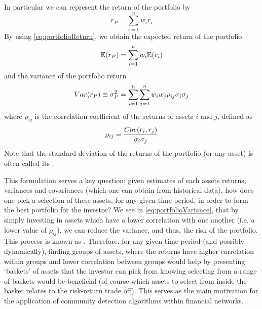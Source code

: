 In particular we can represent the return of the portfolio by
\begin{equation}
	\label{eq:portfolioReturn}
	r_{P} = \sum_{i=1}^{n} w_{i} r_{i}
\end{equation}
By using \cref{eq:portfolioReturn}, we obtain the expected return of the portfolio
\begin{equation}
	\label{eq:portfolioExpectedReturn}
	\mathbb{E}(r_{P}) = \sum_{i=1}^{n} w_{i} \mathbb{E}(r_{i})
\end{equation}
and the variance of the portfolio return
\begin{equation}
	\label{eq:portfolioVariance}
	Var(r_{P}) \equiv \sigma^{2}_{P}  = \sum_{i=1}^{n} \sum_{j=1}^{n} w_{i} w_{j} \rho_{ij} \sigma_{i} \sigma_{j}
\end{equation}
where $\rho_{ij}$ is the correlation coefficient of the returns of assets $i$ and $j$, defined as
\begin{equation}
	\label{eq:correlationCoefficient}
	\rho_{ij} = \frac{\covariance{r_{i},r_{j}}}{\sigma_{i} \sigma_{j}}
\end{equation}
Note that the standard deviation of the returns of the portfolio (or any asset) is often called its .

This formulation serves a key question; given estimates of each assets returns, variances and covariances (which one can obtain from historical data), how does one pick a selection of these assets, for any given time period, in order to form the best portfolio for the investor?
We see in \cref{eq:portfolioVariance}, that by simply investing in assets which have a lower correlation with one another (i.e. a lower value of $\rho_{ij}$), we can reduce the variance, and thus, the risk of the portfolio.
This process is known as  \cite{Lue98,BKM13}.
Therefore, for any given time period (and possibly dynamically), finding groups of assets, where the returns have higher correlation within groups and lower correlation between groups would help by presenting `baskets' of assets that the investor can pick from knowing selecting from a range of baskets would be beneficial (of course which assets to select from inside the basket relates to the risk-return trade off).
This serves as the main motivation for the application of community detection algorithms within financial networks.


